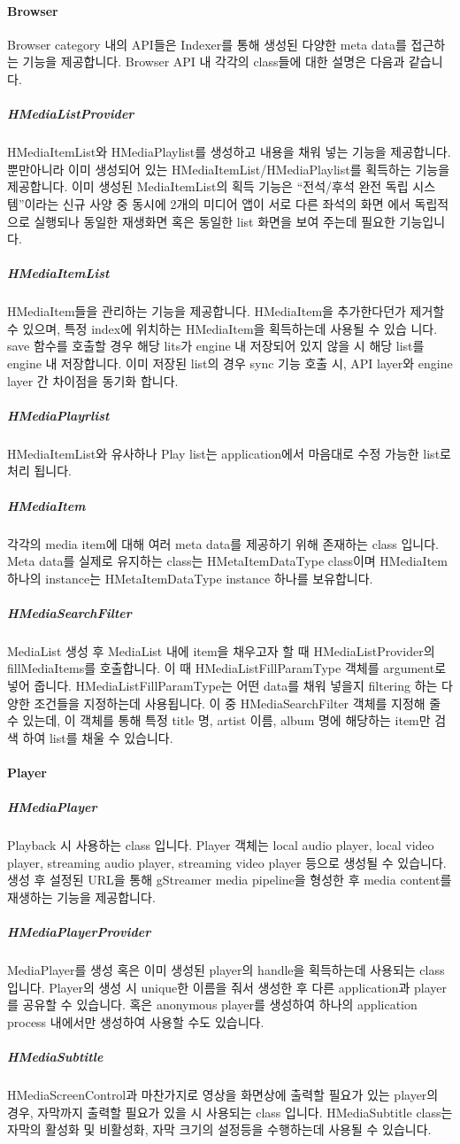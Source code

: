 \paragraph{Browser}
Browser category 내의 API들은 Indexer를 통해 생성된 다양한 meta data를 접근하는 기능을 제공합니다. Browser API 내 각각의 class들에 대한 설명은 다음과 같습니다.
\subparagraph{HMediaListProvider}
HMediaItemList와 HMediaPlaylist를 생성하고 내용을 채워 넣는 기능을 제공합니다. 뿐만아니라 이미 생성되어 있는 HMediaItemList/HMediaPlaylist를 획득하는
기능을 제공합니다. 이미 생성된 MediaItemList의 획득 기능은 “전석/후석 완전 독립 시스템”이라는 신규 사양 중 동시에 2개의 미디어 앱이 서로 다른 좌석의 화면
에서 독립적으로 실행되나 동일한 재생화면 혹은 동일한 list 화면을 보여 주는데 필요한 기능입니다.
\subparagraph{HMediaItemList}
HMediaItem들을 관리하는 기능을 제공합니다. HMediaItem을 추가한다던가 제거할 수 있으며, 특정 index에 위치하는 HMediaItem을 획득하는데 사용될 수 있습 니다. save 함수를 호출할 경우 해당 lits가 engine 내 저장되어 있지 않을 시 해당 list를 engine 내 저장합니다. 이미 저장된 list의 경우 sync 기능 호출 시, API layer와 engine layer 간 차이점을 동기화 합니다.
\subparagraph{HMediaPlayrlist}
HMediaItemList와 유사하나 Play list는 application에서 마음대로 수정 가능한 list로 처리 됩니다.
\subparagraph{HMediaItem}
각각의 media item에 대해 여러 meta data를 제공하기 위해 존재하는 class 입니다. Meta data를 실제로 유지하는 class는 HMetaItemDataType class이며 HMediaItem
하나의 instance는 HMetaItemDataType instance 하나를 보유합니다.
\subparagraph{HMediaSearchFilter}
MediaList 생성 후 MediaList 내에 item을 채우고자 할 때 HMediaListProvider의 fillMediaItems를 호출합니다. 이 때 HMediaListFillParamType 객체를 argument로 넣어 줍니다. HMediaListFillParamType는 어떤 data를 채워 넣을지 filtering 하는 다양한 조건들을 지정하는데 사용됩니다. 이 중 HMediaSearchFilter 객체를 지정해 줄 수 있는데, 이 객체를 통해 특정 title 명, artist 이름, album 명에 해당하는 item만 검색 하여 list를 채울 수 있습니다.

\paragraph{Player}
\subparagraph{HMediaPlayer}
Playback 시 사용하는 class 입니다. Player 객체는 local audio player, local video player, streaming audio player, streaming video player 등으로 생성될 수 있습니다. 생성 후 설정된 URL을 통해 gStreamer media pipeline을 형성한 후 media content를 재생하는 기능을 제공합니다.
\subparagraph{HMediaPlayerProvider}
MediaPlayer를 생성 혹은 이미 생성된 player의 handle을 획득하는데 사용되는 class 입니다. Player의 생성 시 unique한 이름을 줘서 생성한 후 다른 application과 player를 공유할 수 있습니다. 혹은 anonymous player를 생성하여 하나의 application process 내에서만 생성하여 사용할 수도 있습니다.
\subparagraph{HMediaSubtitle}
HMediaScreenControl과 마찬가지로 영상을 화면상에 출력할 필요가 있는 player의 경우, 자막까지 출력할 필요가 있을 시 사용되는 class 입니다. HMediaSubtitle class는
자막의 활성화 및 비활성화, 자막 크기의 설정등을 수행하는데 사용될 수 있습니다.

